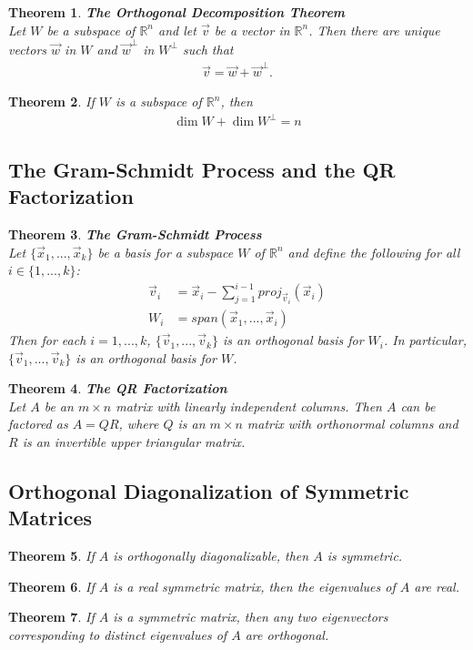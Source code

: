 \documentclass{article}
\theoremstyle{sltheorem}
\newtheorem{theorem}{Theorem}[section]
\begin{document}
\begin{theorem}
    \textbf{The Orthogonal Decomposition Theorem}\\
    Let $W$ be a subspace of $\mathbb{R}^n$ and let $\vec v$ be a vector in $\mathbb{R}^n$.
    Then there are unique vectors $\vec w$ in $W$ and $\vec w^{\perp}$ in $W^{\perp}$ such that
\begin{align*}
    \vec v = \vec w + \vec w^{\perp}.
\end{align*}
\end{theorem}
\setcounter{theorem}{12}
\begin{theorem}
    If $W$ is a subspace of $\mathbb{R}^n$, then
    \begin{align*}
        \dim W + \dim W^{\perp} = n        
    \end{align*}
\end{theorem}
\setcounter{theorem}{14}
\subsection{The Gram-Schmidt Process and the QR Factorization}
\begin{theorem}
    \textbf{The Gram-Schmidt Process}\\
    Let $\{\vec x_1, ..., \vec x_k\}$ be a basis for a subspace $W$ of $\mathbb{R}^n$ and define the following for all $i\in\{1,...,k\}$:
    \begin{align*}
        \vec v_i &= \vec x_i - \sum^{i-1}_{j=1} proj_{\vec v_i}(\vec x_i)\\
        W_i &= span(\vec x_1, ..., \vec x_i)
    \end{align*}
    Then for each $i=1, ..., k$, $\{\vec v_1, ..., \vec v_k\}$ is an orthogonal basis for $W_i$. In particular, $\{\vec v_1, ..., \vec v_k\}$ is an orthogonal basis for $W$.
\end{theorem}
\begin{theorem}
    \textbf{The QR Factorization}\\
    Let $A$ be an $m\times n$ matrix with linearly independent columns. Then $A$ can be factored as $A=QR$, where $Q$ is an $m\times n$ matrix with orthonormal columns and $R$ is an invertible upper triangular matrix.
\end{theorem}
\subsection{Orthogonal Diagonalization of Symmetric Matrices}
\begin{theorem}
    If $A$ is orthogonally diagonalizable, then $A$ is symmetric.
\end{theorem}
\begin{theorem}
    If $A$ is a real symmetric matrix, then the eigenvalues of $A$ are real.
\end{theorem}
\begin{theorem}
    If $A$ is a symmetric matrix, then any two eigenvectors corresponding to distinct eigenvalues of $A$ are orthogonal.
\end{theorem}
\end{document}
